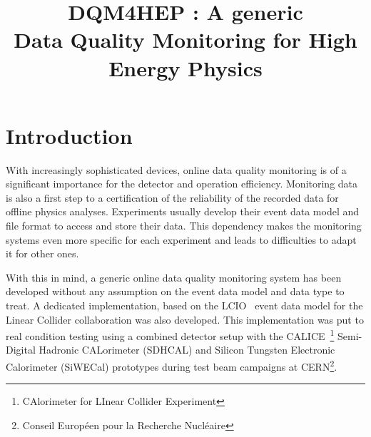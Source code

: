 \documentclass[conference]{IEEEtran}
\begin{document}
\title{DQM4HEP : A generic\\Data Quality Monitoring for High Energy Physics}

\author{


\and


\and


}

\maketitle

\IEEEpeerreviewmaketitle

\section{Introduction}

With increasingly sophisticated devices, online data quality monitoring is of a significant importance for the detector and operation efficiency. Monitoring data is also a first step to a certification of the reliability of the recorded data for offline physics analyses. Experiments usually develop their event data model and file format to access and store their data. This dependency makes the monitoring systems even more specific for each experiment and leads to difficulties to adapt it for other ones.

With this in mind, a generic online data quality monitoring system has been developed without any assumption on the event data model and data type to treat. A dedicated implementation, based on the LCIO~\cite{LCIO} event data model for the Linear Collider collaboration was also developed. This implementation was put to real condition testing using a combined detector setup with the CALICE~\footnote{CAlorimeter for LInear Collider Experiment} Semi-Digital Hadronic CALorimeter (SDHCAL) and Silicon Tungsten Electronic Calorimeter (SiWECal) prototypes during test beam campaigns at CERN\footnote{Conseil Européen pour la Recherche Nucléaire}.
\end{document}
